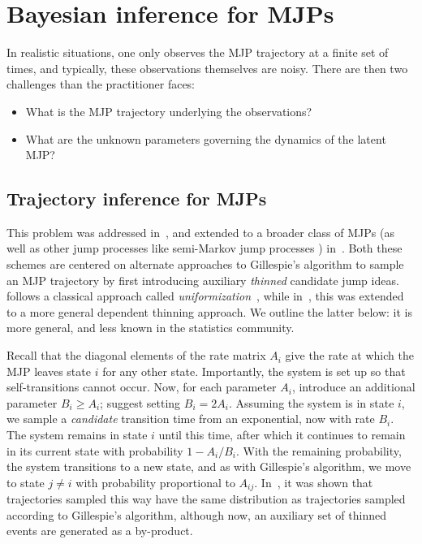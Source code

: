 
\section{Bayesian inference for MJPs}
In realistic situations, one only observes the MJP trajectory at
a finite set of times, and typically, these observations themselves
are noisy. There are then two challenges than the practitioner
faces:
\begin{itemize}
  \item What is the MJP trajectory underlying the observations?
  \item What are the unknown parameters governing the dynamics of the 
    latent MJP?
\end{itemize}

\subsection{Trajectory inference for MJPs}
This problem was addressed in~\cite{RaoTeh13}, and extended to a broader 
class of MJPs (as well as other jump processes like semi-Markov jump processes
) in~\cite{RaoTeh12}. Both these schemes are centered on alternate
approaches to Gillespie's algorithm to sample an MJP trajectory by 
first introducing auxiliary {\em thinned} candidate jump ideas. 
\cite{RaoTeh13} follows a classical approach called 
{\em uniformization}~\cite{Jen1953}, while in~\cite{RaoTeh12}, this was
extended to a more general dependent thinning approach. We outline
the latter below: it is more general, and less known in the statistics
community.

Recall that the diagonal elements of the rate matrix $A_i$ give the 
rate at which the MJP leaves state $i$ for any other state. Importantly,
the system is set up so that self-transitions cannot occur. Now,
for each parameter $A_i$, introduce an additional parameter $B_i \ge A_i$;
\cite{RaoTeh12} suggest setting $B_i = 2 A_i$. Assuming the system is
in state $i$, we sample a {\em candidate} transition time from an
exponential, now with rate $B_i$. The system remains in state $i$
until this time, after which it continues to remain in its current state with 
probability $1-A_i/B_i$. With the remaining 
probability, the system transitions to a new state, and as with
Gillespie's algorithm, we move to state $j \neq i$ with probability
proportional to $A_{ij}$. In~\cite{RaoTeh12}, it was shown that
trajectories sampled this way have the same distribution as trajectories
sampled according to Gillespie's algorithm, although now, an auxiliary
set of thinned events are generated as a by-product.

